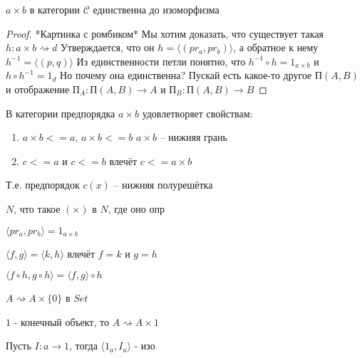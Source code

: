 \begin{stmt}
  $a \times b$ в категории $\mathcal{C}$ единственна до изоморфизма
\end{stmt}
\begin{proof}
  *Картинка с ромбиком*
  Мы хотим доказать, что существует такая $h \colon a \times b \rightsquigarrow d$
  Утверждается, что он $h = \langle (pr_a, pr_b) \rangle$, а обратное к нему $h^{-1}
  = \langle (p, q) \rangle$
  Из единственности петли понятно, что $h^{-1} \circ h = 1_{a \times b}$ и $h
  \circ h^{-1} = 1_d$
  Но почему она единственна? Пускай есть какое-то другое $П(A, B)$ и отображение
  $П_A \colon П(A, B) \to A$ и $П_B \colon П(A, B) \to B$
\end{proof}

\begin{task}
  В категории предпорядка
  $a \times b$ удовлетворяет свойствам:
  \begin{enumerate}
    \item $a \times b <= a$, $a \times b <= b$
      $a \times b$ -- нижняя грань
    \item $c <= a$ и $c <= b$ влечёт $c <= a \times b$
  \end{enumerate}
  Т.е. предпорядок $c (x)$ -- нижняя полурешётка
\end{task}

\begin{task}
  $N$, что такое $(\times)$ в $N$, где оно опр
\end{task}

\begin{task}
  $\langle pr_a, pr_b \rangle = 1_{a \times b}$
\end{task}

\begin{task}
  $\langle f, g \rangle = \langle k, h \rangle$ влечёт $f = k$ и $g = h$
\end{task}

\begin{task}
  $\langle f \circ h, g \circ h \rangle = \langle f, g \rangle \circ h$
\end{task}

\begin{task}
  $A \rightsquigarrow A \times \{0\}$ в $Set$
\end{task}

\begin{task}
  $1$ - конечный объект, то $A \rightsquigarrow A \times 1$
\end{task}

\begin{task}
  Пусть $I \colon a \to 1$, тогда $\langle 1_a, I_a \rangle$ - изо
\end{task}